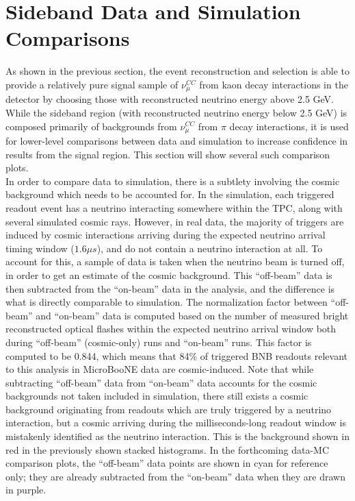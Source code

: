 \section{Sideband Data and Simulation Comparisons}
As shown in the previous section, the event reconstruction and selection is able to provide a relatively pure signal sample of $\nu_\mu^{CC}$ from kaon decay interactions in the detector by choosing those with reconstructed neutrino energy above 2.5 GeV. While the sideband region (with reconstructed neutrino energy below 2.5 GeV) is composed primarily of backgrounds from $\nu_\mu^{CC}$ from $\pi$ decay interactions, it is used for lower-level comparisons between data and simulation to increase confidence in results from the signal region. This section will show several such comparison plots.\\

In order to compare data to simulation, there is a subtlety involving the cosmic background which needs to be accounted for. In the simulation, each triggered readout event has a neutrino interacting somewhere within the TPC, along with several simulated cosmic rays. However, in real data, the majority of triggers are induced by cosmic interactions arriving during the expected neutrino arrival timing window ($1.6\mu s$), and do not contain a neutrino interaction at all. To account for this, a sample of data is taken when the neutrino beam is turned off, in order to get an estimate of the cosmic background. This ``off-beam'' data is then subtracted from the ``on-beam'' data in the analysis, and the difference is what is directly comparable to simulation. The normalization factor between ``off-beam'' and ``on-beam'' data is computed based on the number of measured bright reconstructed optical flashes within the expected neutrino arrival window both during ``off-beam'' (cosmic-only) runs and ``on-beam'' runs. This factor is computed to be 0.844, which means that 84\% of triggered BNB readouts relevant to this analysis in MicroBooNE data are cosmic-induced. Note that while subtracting ``off-beam'' data from ``on-beam'' data accounts for the cosmic backgrounds not taken included in simulation, there still exists a cosmic background originating from readouts which are truly triggered by a neutrino interaction, but a cosmic arriving during the milliseconds-long readout window is mistakenly identified as the neutrino interaction. This is the background shown in red in the previously shown stacked histograms. In the forthcoming data-MC comparison plots, the ``off-beam'' data points are shown in cyan for reference only; they are already subtracted from the ``on-beam'' data when they are drawn in purple.\\

